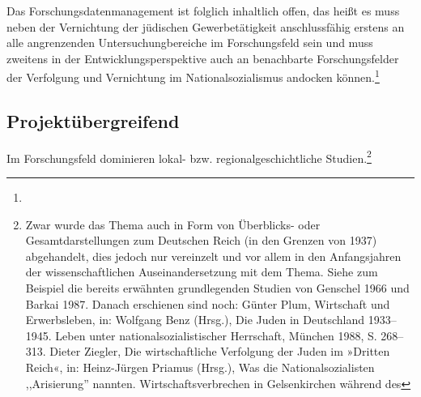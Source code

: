 Das Forschungsdatenmanagement ist folglich inhaltlich offen, das heißt es muss neben der Vernichtung der jüdischen Gewerbetätigkeit anschlussfähig erstens an alle angrenzenden Untersuchungbereiche im Forschungsfeld sein und muss zweitens in der Entwicklungsperspektive auch an benachbarte Forschungsfelder der Verfolgung und Vernichtung im Nationalsozialismus andocken können.\footnote{} 

\subsection{Projektübergreifend}

Im Forschungsfeld dominieren lokal- bzw. regionalgeschichtliche Studien.\footnote{Zwar wurde das Thema auch in Form von Überblicks- oder Gesamtdarstellungen zum Deutschen Reich (in den Grenzen von 1937) abgehandelt, dies jedoch nur vereinzelt und vor allem in den Anfangsjahren der wissenschaftlichen Auseinandersetzung mit dem Thema. Siehe zum Beispiel die bereits erwähnten grundlegenden Studien von Genschel 1966 und Barkai 1987. Danach erschienen sind noch: Günter
Plum, Wirtschaft und Erwerbsleben, in: Wolfgang Benz (Hrsg.), Die Juden in Deutschland 1933–
1945. Leben unter nationalsozialistischer Herrschaft, München 1988, S. 268–313. Dieter Ziegler, Die wirtschaftliche
Verfolgung der Juden im »Dritten Reich«, in: Heinz-Jürgen Priamus (Hrsg.), Was die
Nationalsozialisten ,,Arisierung'' nannten. Wirtschaftsverbrechen in Gelsenkirchen während des
}
